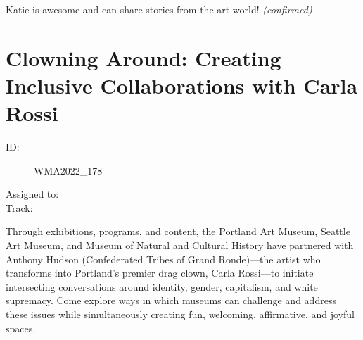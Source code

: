 \documentclass{report}
\begin{document}
                Katie is awesome and can share stories from the art world!
                \emph{ (confirmed) }
              

              

              
        
          \newpage
          \section{ Clowning Around: Creating Inclusive Collaborations with Carla Rossi }
            \begin{description}
              \item [ID:]
              WMA2022\_178

              \item [Assigned to:]
                \item [Track:]
              \end{description}

              Through exhibitions, programs, and content, the Portland Art Museum, Seattle Art Museum, and Museum of Natural and Cultural History have partnered with Anthony Hudson (Confederated Tribes of Grand Ronde)—the artist who transforms into Portland’s premier drag clown, Carla Rossi—to initiate intersecting conversations around identity, gender, capitalism, and white supremacy. Come explore ways in which museums can challenge and address these issues while simultaneously creating fun, welcoming, affirmative, and joyful spaces.
\end{document}
